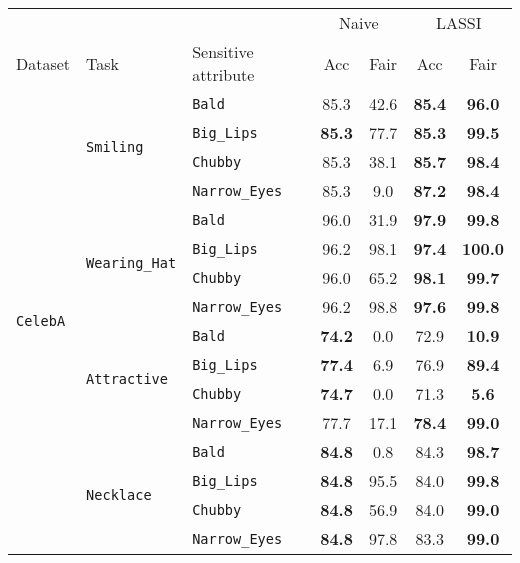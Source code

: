 \begin{table}[H]
\small
\centering
\begin{tabular}{lllcccc}
\toprule
\multicolumn{3}{c}{} & \multicolumn{2}{c}{Naive} & \multicolumn{2}{c}{LASSI} \\
\cmidrule(rl){4-5} \cmidrule(rl){6-7}
Dataset & Task & Sensitive attribute & {Acc} & {Fair} & {Acc} & {Fair} \\
\cmidrule(rl){1-3} \cmidrule(rl){4-5} \cmidrule(rl){6-7}
\multirow{16}{*}{\texttt{CelebA}} & \multirow{4}{*}{\texttt{Smiling}} & \texttt{Bald} & 85.3 & 42.6 & \textbf{85.4} & \textbf{96.0} \\
& & \texttt{Big\_Lips} & \textbf{85.3} & 77.7 & \textbf{85.3} & \textbf{99.5} \\
& & \texttt{Chubby} & 85.3 & 38.1 & \textbf{85.7} & \textbf{98.4} \\
& & \texttt{Narrow\_Eyes} & 85.3 & 9.0 & \textbf{87.2} & \textbf{98.4} \\
\cmidrule(rl){2-3} \cmidrule(rl){4-5} \cmidrule(rl){6-7}
& \multirow{4}{*}{\texttt{Wearing\_Hat}} & \texttt{Bald} & 96.0 & 31.9 & \textbf{97.9} & \textbf{99.8} \\
& & \texttt{Big\_Lips} & 96.2 & 98.1 & \textbf{97.4} & \textbf{100.0} \\
& & \texttt{Chubby} & 96.0 & 65.2 & \textbf{98.1} & \textbf{99.7} \\
& & \texttt{Narrow\_Eyes} & 96.2 & 98.8 & \textbf{97.6} & \textbf{99.8} \\
\cmidrule(rl){2-3} \cmidrule(rl){4-5} \cmidrule(rl){6-7}
& \multirow{4}{*}{\texttt{Attractive}} & \texttt{Bald} & \textbf{74.2} & 0.0 & 72.9 & \colorbox{myred}{\textbf{10.9}} \\
& & \texttt{Big\_Lips} & \textbf{77.4} & 6.9 & 76.9 & \textbf{89.4} \\
& & \texttt{Chubby} & \textbf{74.7} & 0.0 & 71.3 & \colorbox{myred}{\textbf{5.6}} \\
& & \texttt{Narrow\_Eyes} & 77.7 & 17.1 & \textbf{78.4} & \textbf{99.0} \\
\cmidrule(rl){2-3} \cmidrule(rl){4-5} \cmidrule(rl){6-7}
& \multirow{4}{*}{\texttt{Necklace}} & \texttt{Bald} & \textbf{84.8} & 0.8 & 84.3 & \textbf{98.7} \\
& & \texttt{Big\_Lips} & \textbf{84.8} & 95.5 & 84.0 & \textbf{99.8} \\
& & \texttt{Chubby} & \textbf{84.8} & 56.9 & 84.0 & \textbf{99.0} \\
& & \texttt{Narrow\_Eyes} & \textbf{84.8} & 97.8 & 83.3 & \textbf{99.0} \\

\end{tabular}
\end{table}
